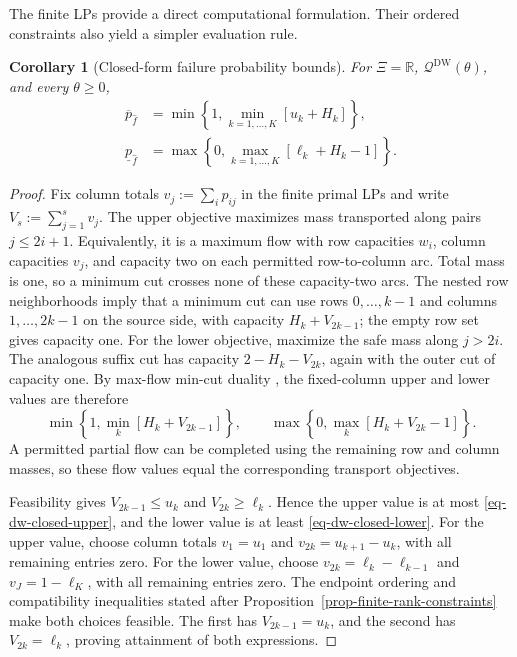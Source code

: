 \documentclass[review,11pt,3p,authoryear,nopreprintline]{elsarticle}
\newtheorem{corollary}{Corollary}
\begin{document}
The finite LPs provide a direct computational formulation. Their ordered constraints also yield a simpler evaluation rule.

\begin{corollary}[Closed-form failure probability bounds]
  \label{thm-closed-form-bounds}
  For $\Xi=\mathbb R$, $\mathscr Q^{\mathrm{DW}}(\theta)$, and every $\theta\ge0$,
  \begin{align}
    \overline p_{\hat f}
    &=\min\left\{1,\min_{k=1,\ldots,K}\left[u_k+H_k\right]\right\},
    \label{eq-dw-closed-upper}\\
    \underline p_{\hat f}
    &=\max\left\{0,\max_{k=1,\ldots,K}\left[\ell_k+H_k-1\right]\right\}.
    \label{eq-dw-closed-lower}
  \end{align}
\end{corollary}
\begin{proof}
  Fix column totals $v_j:=\sum_i p_{ij}$ in the finite primal LPs and write $V_s:=\sum_{j=1}^s v_j$. The upper objective maximizes mass transported along pairs $j\le2i+1$. Equivalently, it is a maximum flow with row capacities $w_i$, column capacities $v_j$, and capacity two on each permitted row-to-column arc. Total mass is one, so a minimum cut crosses none of these capacity-two arcs. The nested row neighborhoods imply that a minimum cut can use rows $0,\ldots,k-1$ and columns $1,\ldots,2k-1$ on the source side, with capacity $H_k+V_{2k-1}$; the empty row set gives capacity one. For the lower objective, maximize the safe mass along $j>2i$. The analogous suffix cut has capacity $2-H_k-V_{2k}$, again with the outer cut of capacity one. By max-flow min-cut duality \citep{F.F56}, the fixed-column upper and lower values are therefore
  \[
    \min\left\{1,\min_k\left[H_k+V_{2k-1}\right]\right\},\qquad
    \max\left\{0,\max_k\left[H_k+V_{2k}-1\right]\right\}.
  \]
  A permitted partial flow can be completed using the remaining row and column masses, so these flow values equal the corresponding transport objectives.

  Feasibility gives $V_{2k-1}\le u_k$ and $V_{2k}\ge\ell_k$. Hence the upper value is at most \eqref{eq-dw-closed-upper}, and the lower value is at least \eqref{eq-dw-closed-lower}. For the upper value, choose column totals $v_1=u_1$ and $v_{2k}=u_{k+1}-u_k$, with all remaining entries zero. For the lower value, choose $v_{2k}=\ell_k-\ell_{k-1}$ and $v_J=1-\ell_K$, with all remaining entries zero. The endpoint ordering and compatibility inequalities stated after Proposition~\ref{prop-finite-rank-constraints} make both choices feasible. The first has $V_{2k-1}=u_k$, and the second has $V_{2k}=\ell_k$, proving attainment of both expressions.
\end{proof}
\end{document}
